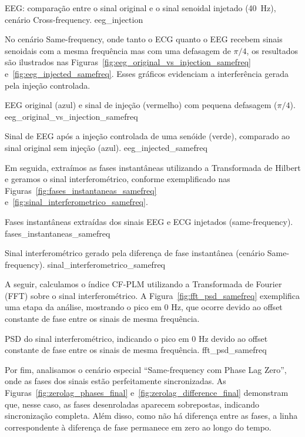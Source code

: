 \begin{itemize}
{EEG: comparação entre o sinal original e o sinal senoidal injetado (40~Hz), cenário Cross-frequency.}
{eeg_injection}


No cenário Same-frequency, onde tanto o ECG quanto o EEG recebem sinais senoidais com a mesma frequência mas com uma defasagem de \(\pi/4\), os resultados são ilustrados nas Figuras~\ref{fig:eeg_original_vs_injection_samefreq} e~\ref{fig:eeg_injected_samefreq}. Esses gráficos evidenciam a interferência gerada pela injeção controlada.

{EEG original (azul) e sinal de injeção (vermelho) com pequena defasagem (\(\pi/4\)).}
{eeg_original_vs_injection_samefreq}

{Sinal de EEG após a injeção controlada de uma senóide (verde), comparado ao sinal original sem injeção (azul).}
{eeg_injected_samefreq}


Em seguida, extraímos as fases instantâneas utilizando a Transformada de Hilbert e geramos o sinal interferométrico, conforme exemplificado nas Figuras~\ref{fig:fases_instantaneas_samefreq} e~\ref{fig:sinal_interferometrico_samefreq}.

{Fases instantâneas extraídas dos sinais EEG e ECG injetados (same-frequency).}
{fases_instantaneas_samefreq}

{Sinal interferométrico gerado pela diferença de fase instantânea (cenário Same-frequency).}
{sinal_interferometrico_samefreq}


A seguir, calculamos o índice CF-PLM utilizando a Transformada de Fourier (FFT) sobre o sinal interferométrico. A Figura~\ref{fig:fft_psd_samefreq} exemplifica uma etapa da análise, mostrando o pico em 0 Hz, que ocorre devido ao offset constante de fase entre os sinais de mesma frequência.

{PSD do sinal interferométrico, indicando o pico em 0 Hz devido ao offset constante de fase entre os sinais de mesma frequência.}
{fft_psd_samefreq}

Por fim, analisamos o cenário especial \textquotedblleft Same-frequency com Phase Lag Zero\textquotedblright, onde as fases dos sinais estão perfeitamente sincronizadas. As Figuras~\ref{fig:zerolag_phases_final} e~\ref{fig:zerolag_difference_final} demonstram que, nesse caso, as fases desenroladas aparecem sobrepostas, indicando sincronização completa. Além disso, como não há diferença entre as fases, a linha correspondente à diferença de fase permanece em zero ao longo do tempo.


\end{itemize}

